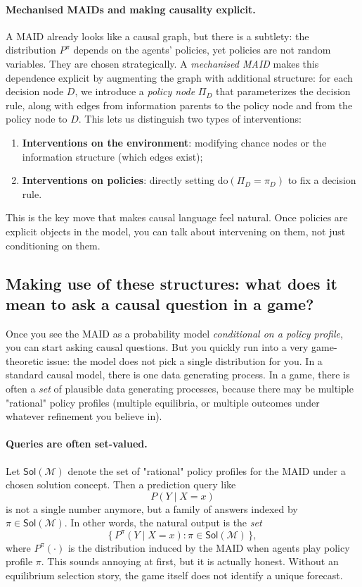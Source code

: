 \documentclass{article}
\providecommand{\do}{\mathrm{do}}
\begin{document}
\paragraph{Mechanised MAIDs and making causality explicit.}
A MAID already looks like a causal graph, but there is a subtlety: the distribution $P^\pi$ depends on the agents' policies, yet policies are not random variables. They are chosen strategically. A \emph{mechanised MAID} makes this dependence explicit by augmenting the graph with additional structure: for each decision node $D$, we introduce a \emph{policy node} $\Pi_D$ that parameterizes the decision rule, along with edges from information parents to the policy node and from the policy node to $D$. This lets us distinguish two types of interventions:
\begin{enumerate}
  \item[(i)] \textbf{Interventions on the environment}: modifying chance nodes or the information structure (which edges exist);
  \item[(ii)] \textbf{Interventions on policies}: directly setting $\do(\Pi_D = \pi_D)$ to fix a decision rule.
\end{enumerate}
This is the key move that makes causal language feel natural. Once policies are explicit objects in the model, you can talk about intervening on them, not just conditioning on them.

\subsection{Making use of these structures: what does it mean to ask a causal question in a game?}
Once you see the MAID as a probability model \emph{conditional on a policy profile}, you can start asking causal questions. But you quickly run into a very game-theoretic issue: the model does not pick a single distribution for you. In a standard causal model, there is one data generating process. In a game, there is often a \emph{set} of plausible data generating processes, because there may be multiple "rational" policy profiles (multiple equilibria, or multiple outcomes under whatever refinement you believe in).

\paragraph{Queries are often set-valued.}
Let $\mathsf{Sol}(\mathcal{M})$ denote the set of "rational" policy profiles for the MAID under a chosen solution concept. Then a prediction query like
\[
P(Y \mid X=x)
\]
is not a single number anymore, but a family of answers indexed by $\pi\in\mathsf{Sol}(\mathcal{M})$. In other words, the natural output is the \emph{set}
\[
\Big\{\, P^{\pi}(Y \mid X=x) : \pi\in\mathsf{Sol}(\mathcal{M}) \,\Big\},
\]
where $P^{\pi}(\cdot)$ is the distribution induced by the MAID when agents play policy profile $\pi$. This sounds annoying at first, but it is actually honest. Without an equilibrium selection story, the game itself does not identify a unique forecast.
\end{document}
